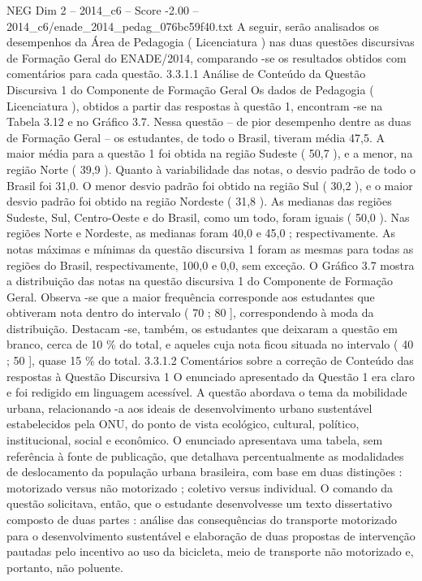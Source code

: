 \begin{textsample}{NEG Dim 2 – 2014\_c6 – Score -2.00 – 2014\_c6/enade\_2014\_pedag\_076bc59f40.txt}
A seguir, serão analisados os desempenhos da Área de Pedagogia ( Licenciatura ) nas duas questões discursivas de Formação Geral do ENADE/2014, comparando -se os resultados obtidos com comentários para cada questão. 3.3.1.1 Análise de Conteúdo da Questão Discursiva 1 do Componente de Formação Geral Os dados de Pedagogia ( Licenciatura ), obtidos a partir das respostas à questão 1, encontram -se na Tabela 3.12 e no Gráfico 3.7.
Nessa questão – de pior desempenho dentre as duas de Formação Geral – os estudantes, de todo o Brasil, tiveram média 47,5.
A maior média para a questão 1 foi obtida na região Sudeste ( 50,7 ), e a menor, na região Norte ( 39,9 ).
Quanto à variabilidade das notas, o desvio padrão de todo o Brasil foi 31,0.
O menor desvio padrão foi obtido na região Sul ( 30,2 ), e o maior desvio padrão foi obtido na região Nordeste ( 31,8 ).
As medianas das regiões Sudeste, Sul, Centro-Oeste e do Brasil, como um todo, foram iguais ( 50,0 ).
Nas regiões Norte e Nordeste, as medianas foram 40,0 e 45,0 ; respectivamente.
As notas máximas e mínimas da questão discursiva 1 foram as mesmas para todas as regiões do Brasil, respectivamente, 100,0 e 0,0, sem exceção.
O Gráfico 3.7 mostra a distribuição das notas na questão discursiva 1 do Componente de Formação Geral.
Observa -se que a maior frequência corresponde aos estudantes que obtiveram nota dentro do intervalo ( 70 ; 80 ], correspondendo à moda da distribuição.
Destacam -se, também, os estudantes que deixaram a questão em branco, cerca de 10 \% do total, e aqueles cuja nota ficou situada no intervalo ( 40 ; 50 ], quase 15 \% do total. 3.3.1.2 Comentários sobre a correção de Conteúdo das respostas à Questão Discursiva 1 O enunciado apresentado da Questão 1 era claro e foi redigido em linguagem acessível.
A questão abordava o tema da mobilidade urbana, relacionando -a aos ideais de desenvolvimento urbano sustentável estabelecidos pela ONU, do ponto de vista ecológico, cultural, político, institucional, social e econômico.
O enunciado apresentava uma tabela, sem referência à fonte de publicação, que detalhava percentualmente as modalidades de deslocamento da população urbana brasileira, com base em duas distinções : motorizado versus não motorizado ; coletivo versus individual.
O comando da questão solicitava, então, que o estudante desenvolvesse um texto dissertativo composto de duas partes : análise das consequências do transporte motorizado para o desenvolvimento sustentável e elaboração de duas propostas de intervenção pautadas pelo incentivo ao uso da bicicleta, meio de transporte não motorizado e, portanto, não poluente.

\end{textsample}
